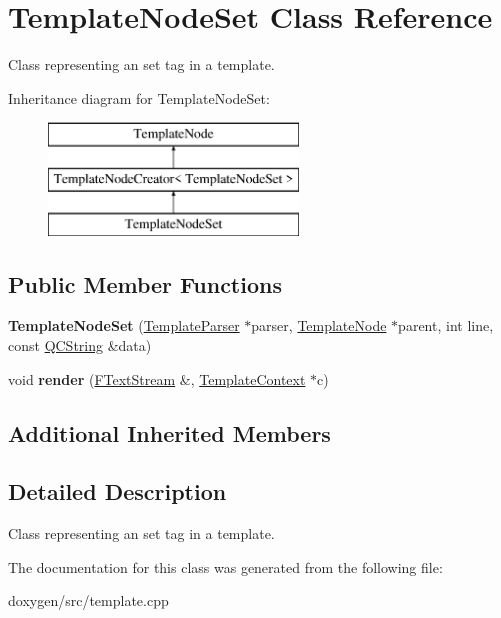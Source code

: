 \hypertarget{class_template_node_set}{}\section{Template\+Node\+Set Class Reference}
\label{class_template_node_set}


Class representing an \textquotesingle{}set\textquotesingle{} tag in a template.  


Inheritance diagram for Template\+Node\+Set\+:\begin{figure}[H]
\begin{center}
\leavevmode
\includegraphics[height=3.000000cm]{class_template_node_set}
\end{center}
\end{figure}
\subsection*{Public Member Functions}
\begin{DoxyCompactItemize}
\item 
\mbox{\label{class_template_node_set_a505e79d778a7682703a23c87237706a1}} 
{\bfseries Template\+Node\+Set} (\mbox{\hyperlink{class_template_parser}{Template\+Parser}} $\ast$parser, \mbox{\hyperlink{class_template_node}{Template\+Node}} $\ast$parent, int line, const \mbox{\hyperlink{class_q_c_string}{Q\+C\+String}} \&data)
\item 
\mbox{\label{class_template_node_set_a2452353d5770fe798175ddc17e820ba8}} 
void {\bfseries render} (\mbox{\hyperlink{class_f_text_stream}{F\+Text\+Stream}} \&, \mbox{\hyperlink{class_template_context}{Template\+Context}} $\ast$c)
\end{DoxyCompactItemize}
\subsection*{Additional Inherited Members}


\subsection{Detailed Description}
Class representing an \textquotesingle{}set\textquotesingle{} tag in a template. 

The documentation for this class was generated from the following file\+:\begin{DoxyCompactItemize}
\item 
doxygen/src/template.\+cpp\end{DoxyCompactItemize}
